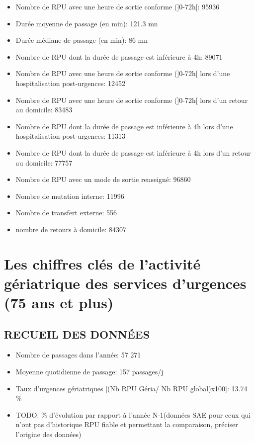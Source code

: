 \documentclass[]{article}
\begin{document}
\begin{itemize}
\item
  Nombre de RPU avec une heure de sortie conforme ({]}0-72h{[}: 95936
\item
  Durée moyenne de passage (en min): 121.3 mn
\item
  Durée médiane de passage (en min): 86 mn
\item
  Nombre de RPU dont la durée de passage est inférieure à 4h: 89071
\item
  Nombre de RPU avec une heure de sortie conforme ({]}0-72h{[} lors
  d'une hospitalisation post-urgences: 12452
\item
  Nombre de RPU avec une heure de sortie conforme ({]}0-72h{[} lors d'un
  retour au domicile: 83483
\item
  Nombre de RPU dont la durée de passage est inférieure à 4h lors d'une
  hospitalisation post-urgences: 11313
\item
  Nombre de RPU dont la durée de passage est inférieure à 4h lors d'un
  retour au domicile: 77757
\item
  Nombre de RPU avec un mode de sortie renseigné: 96860
\item
  Nombre de mutation interne: 11996
\item
  Nombre de transfert externe: 556
\item
  nombre de retours à domicile: 84307
\end{itemize}

\section{Les chiffres clés de l'activité gériatrique des services
d'urgences (75 ans et
plus)}\label{les-chiffres-cles-de-lactivite-geriatrique-des-services-durgences-75-ans-et-plus}

\subsection{RECUEIL DES DONNÉES}\label{recueil-des-donnees-2}

\begin{itemize}
\itemsep1pt\parskip0pt
\item
  Nombre de passages dans l'année: 57 271
\item
  Moyenne quotidienne de passage: 157 passages/j
\item
  Taux d'urgences gériatriques {[}(Nb RPU Géria/ Nb RPU global)x100{]}:
  13.74 \%
\item
  TODO: \% d'évolution par rapport à l'année N-1(données SAE pour ceux
  qui n'ont pas d'historique RPU fiable et permettant la comparaison,
  préciser l'origine des données)
\end{itemize}
\end{document}
